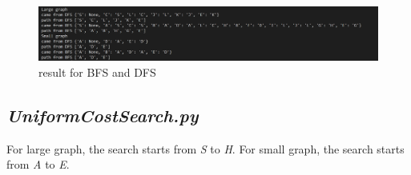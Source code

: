 \documentclass[aps,letterpaper,10pt]{revtex4}
\begin{document}
\begin{figure}[h]
	\centering
	\includegraphics[width=1\textwidth]{BFS_DFS.png}
	\caption{result for BFS and DFS}
	\label{fig:label}
\end{figure}

\subsection{\emph{UniformCostSearch.py}}

For large graph, the search starts from \emph{S} to \emph{H}. For small graph,  the search starts from \emph{A} to \emph{E}.
\end{document}
